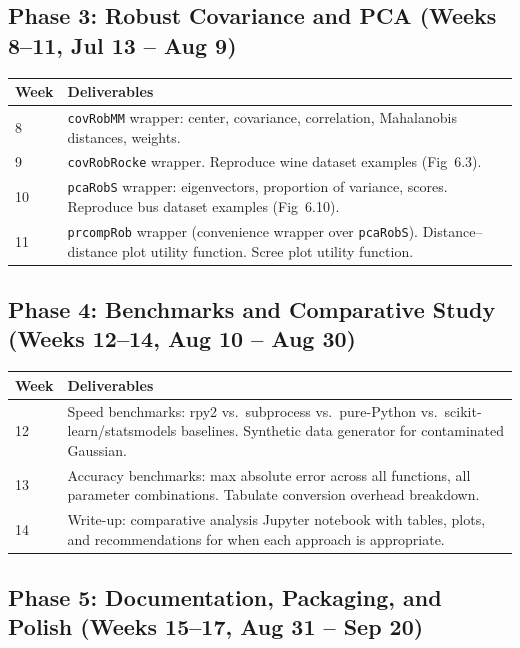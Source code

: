 \documentclass[11pt, a4paper]{article}
\begin{document}
\subsection{Phase 3: Robust Covariance and PCA (Weeks 8--11, Jul 13 -- Aug 9)}

\begin{tabularx}{\linewidth}{@{} l X @{}}
  \toprule
  \textbf{Week} & \textbf{Deliverables} \\
  \midrule
  8  & \texttt{covRobMM} wrapper: center, covariance, correlation,
     Mahalanobis distances, weights. \\
  9  & \texttt{covRobRocke} wrapper.
     Reproduce wine dataset examples (Fig~6.3). \\
  10 & \texttt{pcaRobS} wrapper: eigenvectors, proportion of variance,
     scores.
     Reproduce bus dataset examples (Fig~6.10). \\
  11 & \texttt{prcompRob} wrapper (convenience wrapper over \texttt{pcaRobS}).
     Distance--distance plot utility function.
     Scree plot utility function. \\
  \bottomrule
\end{tabularx}

\subsection{Phase 4: Benchmarks and Comparative Study (Weeks 12--14, Aug 10 -- Aug 30)}

\begin{tabularx}{\linewidth}{@{} l X @{}}
  \toprule
  \textbf{Week} & \textbf{Deliverables} \\
  \midrule
  12 & Speed benchmarks: rpy2 vs.\ subprocess vs.\ pure-Python vs.\
     scikit-learn/statsmodels baselines.
     Synthetic data generator for contaminated Gaussian. \\
  13 & Accuracy benchmarks: max absolute error across all functions,
     all parameter combinations.
     Tabulate conversion overhead breakdown. \\
  14 & Write-up: comparative analysis Jupyter notebook with tables,
     plots, and recommendations for when each approach is appropriate. \\
  \bottomrule
\end{tabularx}

\subsection{Phase 5: Documentation, Packaging, and Polish (Weeks 15--17, Aug 31 -- Sep 20)}
\end{document}
